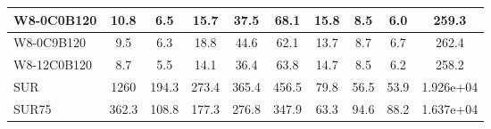 \begin{table}[!htp]
{{\begin{tabular}{|l|ccccccccc|}
W8-0C0B120 & 10.8 \cellcolor{blue!18.07} & 6.5 \cellcolor{red!18.22} & 15.7 \cellcolor{green!18.26} & 37.5 \cellcolor{orange!18.14} & 68.1 \cellcolor{purple!19.38} & 15.8 \cellcolor{blue!20.23} & 8.5 \cellcolor{red!18.51} & 6.0 \cellcolor{green!18.25} & 259.3 \cellcolor{orange!18.00}\\ \hline 
W8-0C9B120 & 9.5 \cellcolor{blue!18.03} & 6.3 \cellcolor{red!18.18} & 18.8 \cellcolor{green!18.77} & 44.6 \cellcolor{orange!19.05} & 62.1 \cellcolor{purple!18.76} & 13.7 \cellcolor{blue!18.88} & 8.7 \cellcolor{red!18.57} & 6.7 \cellcolor{green!18.55} & 262.4 \cellcolor{orange!18.01}\\ \hline 
W8-12C0B120 & 8.7 \cellcolor{blue!18.00} & 5.5 \cellcolor{red!18.00} & 14.1 \cellcolor{green!18.00} & 36.4 \cellcolor{orange!18.00} & 63.8 \cellcolor{purple!18.94} & 14.7 \cellcolor{blue!19.53} & 8.5 \cellcolor{red!18.47} & 6.2 \cellcolor{green!18.30} & 258.2 \cellcolor{orange!18.00}\\ \hline 
SUR & 1260 \cellcolor{blue!60.00} & 194.3 \cellcolor{red!60.00} & 273.4 \cellcolor{green!60.00} & 365.4 \cellcolor{orange!60.00} & 456.5 \cellcolor{purple!60.00} & 79.8 \cellcolor{blue!60.00} & 56.5 \cellcolor{red!41.62} & 53.9 \cellcolor{green!42.54} & 1.926e+04 \cellcolor{orange!60.00}\\ \hline 
SUR75 & 362.3 \cellcolor{blue!29.87} & 108.8 \cellcolor{red!40.99} & 177.3 \cellcolor{green!44.45} & 276.8 \cellcolor{orange!48.69} & 347.9 \cellcolor{purple!48.65} & 63.3 \cellcolor{blue!49.71} & 94.6 \cellcolor{red!60.00} & 88.2 \cellcolor{green!60.00} & 1.637e+04 \cellcolor{orange!53.61}\tabularnewline \hline 
\end{tabular}}\hfill \\
}
\end{table}
